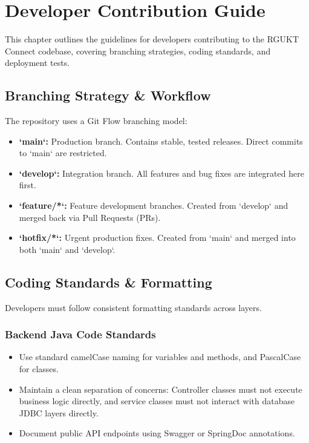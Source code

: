 \chapter{Developer Contribution Guide}
\label{ch:contributing}

This chapter outlines the guidelines for developers contributing to the RGUKT Connect codebase, covering branching strategies, coding standards, and deployment tests.

\section{Branching Strategy \& Workflow}
The repository uses a Git Flow branching model:
\begin{itemize}
    \item \textbf{`main`:} Production branch. Contains stable, tested releases. Direct commits to `main` are restricted.
    \item \textbf{`develop`:} Integration branch. All features and bug fixes are integrated here first.
    \item \textbf{`feature/*`:} Feature development branches. Created from `develop` and merged back via Pull Requests (PRs).
    \item \textbf{`hotfix/*`:} Urgent production fixes. Created from `main` and merged into both `main` and `develop`.
\end{itemize}

\section{Coding Standards \& Formatting}
Developers must follow consistent formatting standards across layers.

\subsection{Backend Java Code Standards}
\begin{itemize}
    \item Use standard camelCase naming for variables and methods, and PascalCase for classes.
    \item Maintain a clean separation of concerns: Controller classes must not execute business logic directly, and service classes must not interact with database JDBC layers directly.
    \item Document public API endpoints using Swagger or SpringDoc annotations.
\end{itemize}

